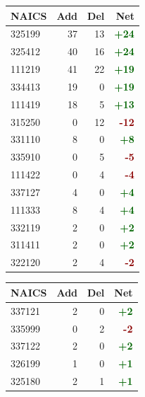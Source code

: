 \documentclass[11pt]{article}
\begin{document}
\begin{table}[H]
\centering
\begin{minipage}{0.48\textwidth}
\centering
{}
\begin{tabular}{lrrr}
\toprule
\textbf{NAICS} & \textbf{Add} & \textbf{Del} & \textbf{Net} \\
\midrule
325199 & 37 & 13 & \textcolor{darkgreen}{\textbf{+24}} \\
325412 & 40 & 16 & \textcolor{darkgreen}{\textbf{+24}} \\
111219 & 41 & 22 & \textcolor{darkgreen}{\textbf{+19}} \\
334413 & 19 & 0 & \textcolor{darkgreen}{\textbf{+19}} \\
111419 & 18 & 5 & \textcolor{darkgreen}{\textbf{+13}} \\
315250 & 0 & 12 & \textcolor{darkred}{\textbf{-12}} \\
331110 & 8 & 0 & \textcolor{darkgreen}{\textbf{+8}} \\
335910 & 0 & 5 & \textcolor{darkred}{\textbf{-5}} \\
111422 & 0 & 4 & \textcolor{darkred}{\textbf{-4}} \\
337127 & 4 & 0 & \textcolor{darkgreen}{\textbf{+4}} \\
111333 & 8 & 4 & \textcolor{darkgreen}{\textbf{+4}} \\
332119 & 2 & 0 & \textcolor{darkgreen}{\textbf{+2}} \\
311411 & 2 & 0 & \textcolor{darkgreen}{\textbf{+2}} \\
322120 & 2 & 4 & \textcolor{darkred}{\textbf{-2}} \\
\bottomrule
\end{tabular}
\end{minipage}
\hfill
\begin{minipage}{0.48\textwidth}
\centering
{}
\begin{tabular}{lrrr}
\toprule
\textbf{NAICS} & \textbf{Add} & \textbf{Del} & \textbf{Net} \\
\midrule
337121 & 2 & 0 & \textcolor{darkgreen}{\textbf{+2}} \\
335999 & 0 & 2 & \textcolor{darkred}{\textbf{-2}} \\
337122 & 2 & 0 & \textcolor{darkgreen}{\textbf{+2}} \\
326199 & 1 & 0 & \textcolor{darkgreen}{\textbf{+1}} \\
325180 & 2 & 1 & \textcolor{darkgreen}{\textbf{+1}} \\

\end{tabular}
\end{minipage}
\end{table}
\end{document}
